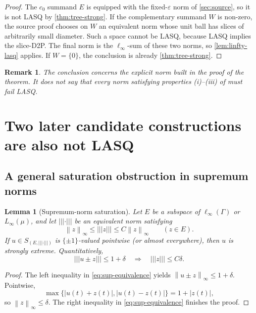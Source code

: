 \documentclass[11pt]{article}
\newtheorem{lemma}[theorem]{Lemma}
\newtheorem{remark}[theorem]{Remark}
\newcommand{\eps}{\varepsilon}
\newcommand{\norm}[1]{\left\lVert #1\right\rVert}
\newcommand{\abs}[1]{\left\lvert #1\right\rvert}
\newcommand{\newnorm}[1]{\left\lvert\!\left\lvert\!\left\lvert #1\right\rvert\!\right\rvert\!\right\rvert}
\begin{document}
\begin{proof}
The $c_0$ summand $E$ is equipped with the fixed-$\eps$ norm of \cref{sec:source}, so it is not LASQ by \cref{thm:tree-strong}.  If the complementary summand $W$ is non-zero, the source proof chooses on $W$ an equivalent norm whose unit ball has slices of arbitrarily small diameter.  Such a space cannot be LASQ, because LASQ implies the slice-D2P.  The final norm is the $\ell_\infty$-sum of these two norms, so \cref{lem:linfty-lasq} applies.  If $W=\{0\}$, the conclusion is already \cref{thm:tree-strong}.
\end{proof}

\begin{remark}
The conclusion concerns the explicit norm built in the proof of the theorem.  It does not say that every norm satisfying properties (i)--(iii) of \cite[Theorem~1.2]{RodriguezRueda2023} must fail LASQ.
\end{remark}

\section{Two later candidate constructions are also not LASQ}
\label{sec:candidates}

\subsection{A general saturation obstruction in supremum norms}

\begin{lemma}[Supremum-norm saturation]
\label{lem:sup-saturation}
Let $E$ be a subspace of $\ell_\infty(\Gamma)$ or $L_\infty(\mu)$, and let $\newnorm{\cdot}$ be an equivalent norm satisfying
\begin{equation}
\label{eq:sup-equivalence}
 \norm{z}_\infty\le\newnorm{z}\le C\norm{z}_\infty
 \qquad(z\in E).
\end{equation}
If $u\in S_{(E,\newnorm{\cdot})}$ is $\{\pm1\}$-valued pointwise (or almost everywhere), then $u$ is strongly extreme.  Quantitatively,
\[
 \newnorm{u\pm z}\le1+\delta
 \quad\Longrightarrow\quad
 \newnorm{z}\le C\delta.
\]
\end{lemma}

\begin{proof}
The left inequality in \eqref{eq:sup-equivalence} yields $\norm{u\pm z}_\infty\le1+\delta$.  Pointwise,
\[
 \max\{\abs{u(t)+z(t)},\abs{u(t)-z(t)}\}=1+\abs{z(t)},
\]
so $\norm{z}_\infty\le\delta$.  The right inequality in \eqref{eq:sup-equivalence} finishes the proof.
\end{proof}
\end{document}
